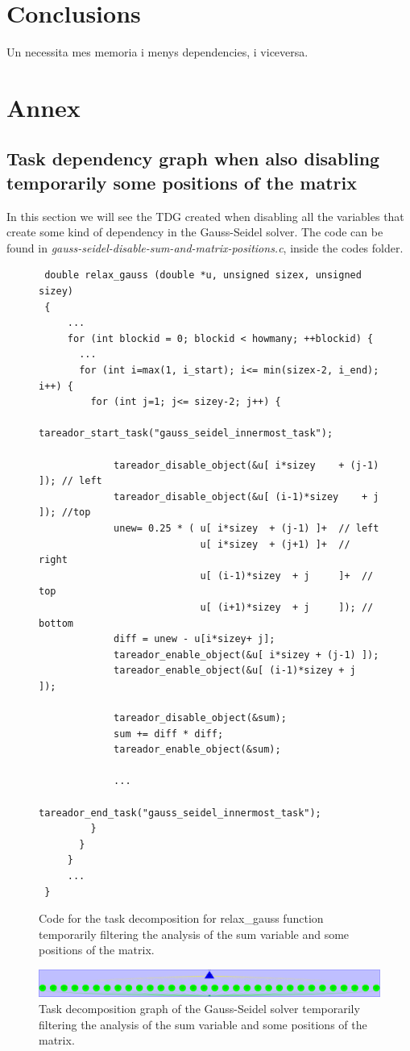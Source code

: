 \documentclass[12pt, a4paper]{article}
\begin{document}
\section{Conclusions}

Un necessita mes memoria i menys dependencies, i viceversa.

\section{Annex}
\subsection{Task dependency graph when also disabling temporarily some positions of the matrix}

In this section we will see the TDG created when disabling all the variables that create some kind of dependency in the Gauss-Seidel solver. The code can be found in \textit{gauss-seidel-disable-sum-and-matrix-positions.c}, inside the codes folder.

\begin{figure}[H]
\begin{lstlisting}
 double relax_gauss (double *u, unsigned sizex, unsigned sizey)
 {
     ...
     for (int blockid = 0; blockid < howmany; ++blockid) {
       ...
       for (int i=max(1, i_start); i<= min(sizex-2, i_end); i++) {
         for (int j=1; j<= sizey-2; j++) {
			 tareador_start_task("gauss_seidel_innermost_task");
 				
			 tareador_disable_object(&u[ i*sizey	+ (j-1) ]); // left
			 tareador_disable_object(&u[ (i-1)*sizey	+ j     ]); //top
			 unew= 0.25 * ( u[ i*sizey	+ (j-1) ]+  // left
 				   			u[ i*sizey	+ (j+1) ]+  // right
				    		u[ (i-1)*sizey	+ j     ]+  // top
				    		u[ (i+1)*sizey	+ j     ]); // bottom
			 diff = unew - u[i*sizey+ j];
			 tareador_enable_object(&u[ i*sizey	+ (j-1) ]);
			 tareador_enable_object(&u[ (i-1)*sizey	+ j     ]);
 			
			 tareador_disable_object(&sum);
			 sum += diff * diff; 
			 tareador_enable_object(&sum);
 			
			 ...
			 tareador_end_task("gauss_seidel_innermost_task");
         }
       }
     }
	 ...
 }
\end{lstlisting}
\caption{Code for the task decomposition for relax\_gauss function temporarily filtering the analysis of the sum variable and some positions of the matrix.}
\end{figure}

\begin{figure}[H]
	\centering
	\includegraphics[scale=0.15]{./images/tareador-gauss-seidel-2b-sum-vector}
	\caption{Task decomposition graph of the Gauss-Seidel solver temporarily filtering the analysis of the sum variable and some positions of the matrix.}
\end{figure}

\label{sec:TDGAllDisablesGaussSeidel}
\end{document}
